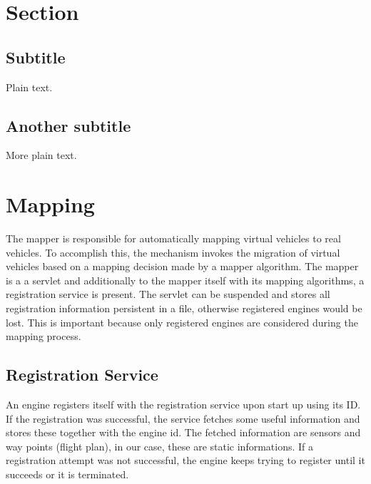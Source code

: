 \section{Section}

\subsection{Subtitle}

Plain text.

\subsection{Another subtitle}

More plain text.


\section{Mapping}
The mapper is responsible for automatically mapping virtual vehicles to real vehicles. To accomplish this, the mechanism invokes 
the migration of virtual vehicles based on a mapping decision made by a mapper algorithm. The mapper is a a servlet and additionally 
to the mapper itself with its mapping algorithms, a registration service is present. The servlet can be suspended and stores all
registration information persistent in a file, otherwise registered engines would be lost. This is important because only registered 
engines are considered during the mapping process.

\subsection{Registration Service}
An engine registers itself with the registration service upon start up using its ID. If the registration was successful, the service
fetches some useful information and stores these together with the engine id. The fetched information are sensors and 
way points (flight plan), in our case, these are static informations. If a registration attempt was not successful, the engine 
keeps trying to register until it succeeds or it is terminated.

